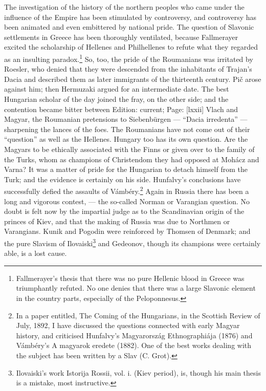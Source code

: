 The investigation of the history of the northern peoples who came under the influence of the Empire has been stimulated by controversy, and controversy has been animated and even embittered by national pride. The question of Slavonic settlements in Greece has been thoroughly ventilated, because Fallmerayer excited the scholarship of Hellenes and Philhellenes to refute what they regarded as an insulting paradox.\footnote{Fallmerayer\texthebrew{}’s thesis that there was no pure Hellenic blood in Greece was triumphantly refuted. No one denies that there was a large Slavonic element in the country parts, especially of the Peloponnesus.} So, too, the pride of the Roumanians was irritated by Roesler, who denied that they were descended from the inhabitants of Trajan\texthebrew{}’s Dacia and described them as later immigrants of the thirteenth century. Pič arose against him; then Hermuzaki argued for an intermediate date. The best Hungarian scholar of the day joined the fray, on the other side; and the contention became bitter between Edition: current; Page: [lxxii] Vlach and Magyar, the Roumanian pretensions to Siebenbürgen \texthebrew{— “}Dacia irredenta\texthebrew{” —} sharpening the lances of the foes. The Roumanians have not come out of their \texthebrew{“}question\texthebrew{}” as well as the Hellenes. Hungary too has its own question. Are the Magyars to be ethically associated with the Finns or given over to the family of the Turks, whom as champions of Christendom they had opposed at Mohácz and Varna? It was a matter of pride for the Hungarian to detach himself from the Turk; and the evidence is certainly on his side. Hunfalvy\texthebrew{}’s conclusions have successfully defied the assaults of Vámbéry.\footnote{In a paper entitled, The Coming of the Hungarians, in the Scottish Review of July, 1892, I have discussed the questions connected with early Magyar history, and criticised Hunfalvy\texthebrew{}’s Magyarország Ethnographiája (1876) and Vámbéry\texthebrew{}’s A magyarok eredete (1882). One of the best works dealing with the subject has been written by a Slav (C. Grot).} Again in Russia there has been a long and vigorous contest, \texthebrew{—} the so-called Norman or Varangian question. No doubt is felt now by the impartial judge as to the Scandinavian origin of the princes of Kiev, and that the making of Russia was due to Northmen or Varangians. Kunik and Pogodin were reinforced by Thomsen of Denmark; and the pure Slavism of Ilovaiski\footnote{Ilovaiski\texthebrew{}’s work Istorija Rossii, vol. i. (Kiev period), is, though his main thesis is a mistake, most instructive.} and Gedeonov, though its champions were certainly able, is a lost cause.

